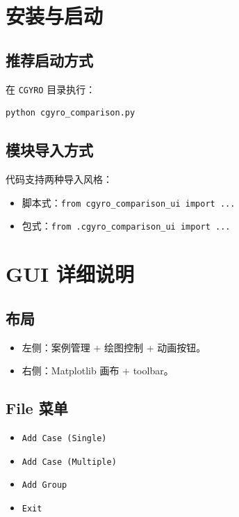 \documentclass[11pt,a4paper]{ctexart}
\begin{document}
\section{安装与启动}
\subsection{推荐启动方式}
在 \texttt{CGYRO} 目录执行：
\begin{lstlisting}
python cgyro_comparison.py
\end{lstlisting}

\subsection{模块导入方式}
代码支持两种导入风格：
\begin{itemize}
  \item 脚本式：\texttt{from cgyro\_comparison\_ui import ...}
  \item 包式：\texttt{from .cgyro\_comparison\_ui import ...}
\end{itemize}

\section{GUI 详细说明}
\subsection{布局}
\begin{itemize}
  \item 左侧：案例管理 + 绘图控制 + 动画按钮。
  \item 右侧：Matplotlib 画布 + toolbar。
\end{itemize}

\subsection{File 菜单}
\begin{itemize}
  \item \texttt{Add Case (Single)}
  \item \texttt{Add Case (Multiple)}
  \item \texttt{Add Group}
  \item \texttt{Exit}
\end{itemize}
\end{document}
